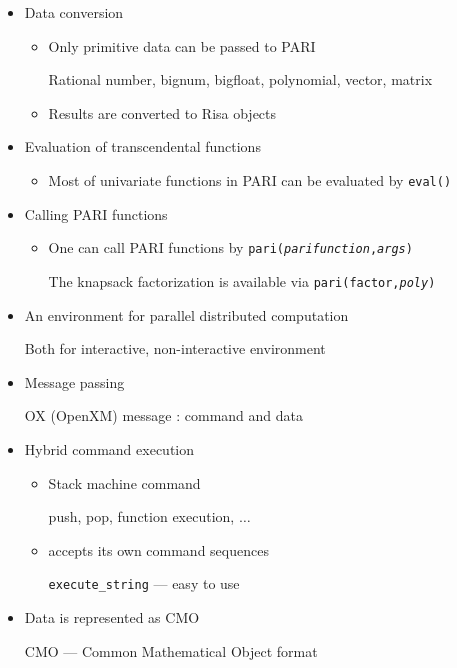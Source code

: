 \begin{slide}{}

\begin{itemize}
\item Data conversion

\begin{itemize}

\item Only primitive data can be passed to PARI

Rational number, bignum, bigfloat, polynomial,
vector, matrix

\item Results are converted to Risa objects

\end{itemize}

\item Evaluation of transcendental functions

\begin{itemize}
\item Most of univariate functions in PARI can be 
evaluated by {\tt eval()}
\end{itemize}

\item Calling PARI functions

\begin{itemize}
\item One can call PARI functions by {\tt pari({\it parifunction},{\it args})}

The knapsack factorization is available via {\tt pari(factor,{\it poly})}
\end{itemize}


\end{itemize}
\end{slide}

\begin{slide}{}

\begin{itemize}
\item An environment for parallel distributed computation

Both for interactive, non-interactive environment

\item Message passing

OX (OpenXM) message : command and data

\item Hybrid command execution

\begin{itemize}
\item Stack machine command

push, pop, function execution, $\ldots$

\item accepts its own command sequences

{\tt execute\_string} --- easy to use
\end{itemize}

\item Data is represented as CMO

CMO --- Common Mathematical Object format
\end{itemize}
\end{slide}

